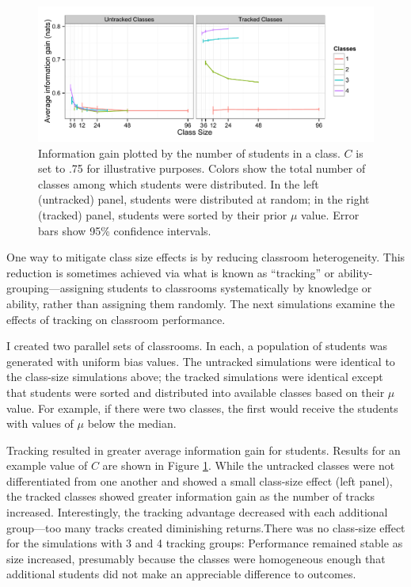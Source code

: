 \documentclass[10pt,letterpaper]{article}
\begin{document}
\begin{figure}
\begin{center}
\includegraphics[width=5.5in]{figures/tracking.pdf}
\end{center}
\caption{\label{fig:tracking} Information gain plotted by the number of students in a class. $C$ is set to .75 for illustrative purposes. Colors show the total number of classes among which students were distributed. In the left (untracked) panel, students were distributed at random; in the right (tracked) panel, students were sorted by their prior $\mu$ value. Error bars show 95\% confidence intervals.}
\end{figure}



One way to mitigate class size effects is by reducing classroom heterogeneity. This reduction is sometimes achieved via what is known as ``tracking'' or ability-grouping---assigning students to classrooms systematically by knowledge or ability, rather than assigning them randomly. The next simulations examine the effects of tracking on classroom performance. 

I created two parallel sets of classrooms. In each, a population of students was generated with uniform bias values. The untracked simulations were identical to the class-size simulations above; the tracked simulations were identical except that students were sorted and distributed into available classes based on their $\mu$ value. For example, if there were two classes, the first would receive the students with values of $\mu$ below the median. 

Tracking resulted in greater average information gain for students. Results for an example value of $C$ are shown in Figure \ref{fig:tracking}. While the untracked classes were not differentiated from one another and showed a small class-size effect (left panel), the tracked classes showed greater information gain as the number of tracks increased. Interestingly, the tracking advantage decreased with each additional group---too many tracks created diminishing returns.There was no class-size effect for the simulations with 3 and 4 tracking groups: Performance remained stable as size increased, presumably because the classes were homogeneous enough that additional students did not make an appreciable difference to outcomes.  
\end{document}
